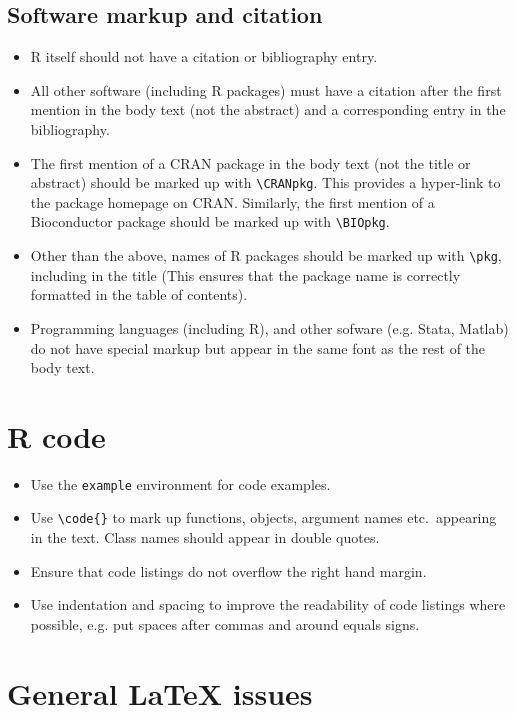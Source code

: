 \documentclass[11pt]{article}
\begin{document}
\subsection*{Software markup and citation}
\begin{itemize}
\item R itself should not have a citation or bibliography entry.
\item All other software (including R packages) must have a citation after
  the first mention in the body text (not the abstract) and a
  corresponding entry in the bibliography.
\item The first mention of a CRAN package in the body text (not the title or
  abstract) should be marked up with \verb+\CRANpkg+. This
  provides a hyper-link to the package homepage on CRAN. Similarly,
  the first mention of a Bioconductor package should be marked up with
  \verb+\BIOpkg+.
\item Other than the above, names of R packages should be marked up with 
  \verb+\pkg+, including in the title (This ensures that the
  package name is correctly formatted in the table of contents).
\item Programming languages (including R), and other sofware
  (e.g. Stata, Matlab) do not have special markup but appear in the
  same font as the rest of the body text.
\end{itemize}

\section*{R code}

\begin{itemize}
\item Use the \verb|example| environment for code examples.
\item Use \verb+\code{}+ to mark up functions, objects, argument names etc.\
appearing in the text.  Class names should appear in double quotes.
\item Ensure that code listings do not overflow the right hand margin.
\item Use indentation and spacing to improve the readability of code
  listings where possible, e.g. put spaces after commas and around
  equals signs.
\end{itemize}

\section*{General LaTeX issues}
\end{document}
